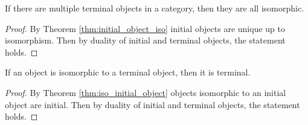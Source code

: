 \begin{theorem}
  If there are multiple terminal objects in a category, then they are all
  isomorphic.

  \begin{proof}
    By Theorem \ref{thm:initial_object_iso} initial objects are unique up to
    isomorphism. Then by duality of initial and terminal objects, the statement
    holds.
  \end{proof}
\end{theorem}

\begin{theorem}
  If an object is isomorphic to a terminal object, then it is terminal.

  \begin{proof}
    By Theorem \ref{thm:iso_initial_object} objects isomorphic to an initial
    object are initial. Then by duality of initial and terminal objects, the
    statement holds.
  \end{proof}
\end{theorem}